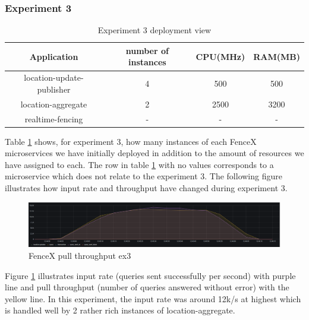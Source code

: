 \documentclass[a4]{report}
\begin{document}
    \subsubsection{Experiment 3}
    \begin{table}[h!]
        \centering
        \begin{tabular}{|c|c|c|c|}
            \hline
            Application               & number of instances & CPU(MHz) & RAM(MB) \\
            \hline
            location-update-publisher & 4                   & 500      & 500     \\
            location-aggregate        & 2                   & 2500     & 3200    \\
            realtime-fencing          & -                   & -        & -       \\
            \hline
        \end{tabular}
        \caption{Experiment 3 deployment view}
        \label{table:ex3-dv}
    \end{table}

    Table \ref{table:ex3-dv} shows, for experiment 3, how many instances of each FenceX microservices we have initially
    deployed in addition to the amount of resources we have assigned to each.
    The row in table \ref{table:ex3-dv} with no values corresponds to a microservice which does not relate to the
    experiment 3.
    The following figure illustrates how input rate and throughput have changed during experiment 3.

    \begin{figure}
        \caption{FenceX pull throughput ex3}
        \label{fig:ex3}
        \includegraphics[scale=0.5]{images/evaluation/ex3-benchmarking(16,9).png}
    \end{figure}

    \clearpage

    Figure \ref{fig:ex3} illustrates input rate (queries sent successfully per second) with purple line and pull
    throughput (number of queries answered without error) with the yellow line.
    In this experiment, the input rate was around 12k/s at highest which is handled well by 2 rather rich instances of
    location-aggregate.
\end{document}
